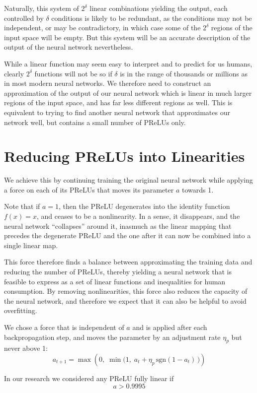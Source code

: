 \documentclass{article}[12pt]
\newcommand{\myskip}{\bigskip\noindent}
\begin{document}
Naturally, this system of $2^\delta$ linear combinations yielding the output, each controlled by $\delta$
conditions is likely to be redundant, as the conditions may not be independent,
or may be contradictory, in which case some of the $2^\delta$ regions of the input space will be empty.
But this system will be an accurate description of the output of the neural network nevertheless.

\myskip
While a linear function may seem easy to interpret and to predict for us humans, clearly $2^\delta$
functions will not be so if $\delta$ is in the range of thousands or millions as in most modern neural networks.
We therefore need to construct an approximation of the output of our neural network which is linear in much
larger regions of the input space, and has far less different regions as well.
This is equivalent to trying to find another neural network that approximates our network well,
but contains a small number of PReLUs only.

\section{Reducing PReLUs into Linearities}

We achieve this by continuing training the original neural network while applying a force on each of
its PReLUs that moves its parameter $a$ towards 1.

Note that if $a=1$, then the PReLU degenerates into the identity function $f(x)=x$, and ceases to be a nonlinearity.
In a sense, it disappears, and the neural network ``collapses'' around it, inasmuch as the linear mapping
that precedes the degenerate PReLU and the one after it can now be combined into a single linear map.

This force therefore finds a balance between approximating the training data
and reducing the number of PReLUs, thereby yielding a neural network that is feasible to express
as a set of linear functions and inequalities for human consumption.
By removing nonlinearities, this force also reduces the capacity of the neural network,
and therefore we expect that it can also be helpful to avoid overfitting.

We chose a
force that is independent of $a$ and is applied after each backpropagation step, and moves the parameter by an adjustment rate
$\eta_p$ but never above 1:
\[ a_{t+1} = \max\left(0,\;\min\big(1,\;a_t + \eta_p\,\mathrm{sgn}(1-a_t)\,\big)\right) \]

In our research we considered any PReLU fully linear if
\[ a > 0.9995 \]
\end{document}
